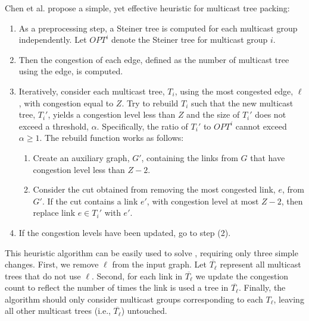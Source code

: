 Chen et al. \cite{Chen00} propose a simple, yet effective heuristic for multicast tree packing:
\begin{enumerate}
	\item As a preprocessing step, a Steiner tree is computed for each multicast group independently.  Let $OPT^i$ denote the Steiner tree for multicast group $i$.
	\item Then the congestion of each edge, defined as the number of multicast tree using the edge, is computed. %
	\item Iteratively, consider each multicast tree, $T_i$, using the most congested edge, $\ell$, with congestion equal to $Z$. Try to rebuild $T_i$ such that the new multicast
		tree, $T_i'$, yields a congestion level less than $Z$ and the size of $T_i'$ does not exceed a threshold, $\alpha$.  Specifically, the ratio of $T_i'$ to $OPT^i$ cannot exceed
		$\alpha \geq 1$.  The rebuild function works as follows:

			\begin{enumerate}
				\item Create an auxiliary graph, $G'$, containing the links from $G$ that have congestion level less than $Z-2$. 
				\item Consider the cut obtained from removing the most congested link, $e$, from $G'$.  If the cut contains a link $e'$, with congestion level at most $Z-2$, then replace 
				link $e \in T_i'$ with $e'$.
			\end{enumerate}
	\item If the congestion levels have been updated, go to step (2). 
\end{enumerate}

This heuristic algorithm can be easily used to solve \mfs, requiring only three simple changes.  First, we remove $\ell$ from the input graph.  Let $\overline{T_\ell}$ represent all multicast trees
that do not use $\ell$. Second, for each link in $\overline{T_\ell}$ we update the congestion count to reflect the number of times the link is used a tree in $\overline{T_\ell}$.  
Finally, the algorithm should only consider multicast groups corresponding to each $T_\ell$, leaving all other multicast trees (i.e., $\overline{T_\ell}$) untouched. 

